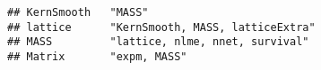 \documentclass[]{book}
\begin{document}
\begin{verbatim}
## KernSmooth   "MASS"                                                                                                                                                                                                                                                                                                                                                                                                                                                                                                                                                                                                                                                                                                    
## lattice      "KernSmooth, MASS, latticeExtra"                                                                                                                                                                                                                                                                                                                                                                                                                                                                                                                                                                                                                                                                          
## MASS         "lattice, nlme, nnet, survival"                                                                                                                                                                                                                                                                                                                                                                                                                                                                                                                                                                                                                                                                           
## Matrix       "expm, MASS"                                                                                                                                                                                                                                                                                                                                                                                                                                                                                                                                                                                                                                                                                              

\end{verbatim}
\end{document}
